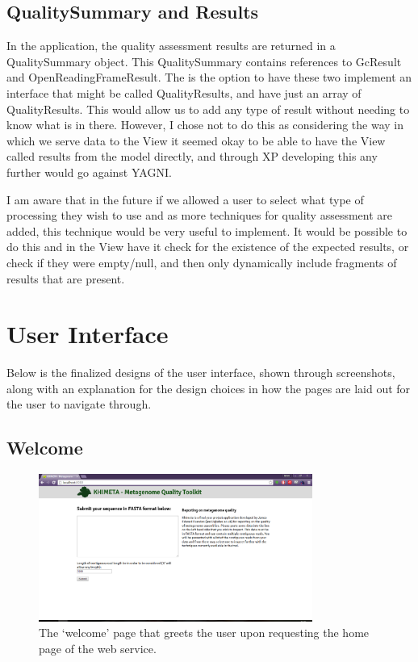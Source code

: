 \subsection{QualitySummary and Results}
In the application, the quality assessment results are returned in a QualitySummary object. This QualitySummary contains references to GcResult and OpenReadingFrameResult. The is the option to have these two implement an interface that might be called QualityResults, and have just an array of QualityResults. This would allow us to add any type of result without needing to know what is in there. However, I chose not to do this as considering the way in which we serve data to the View it seemed okay to be able to have the View called results from the model directly, and through XP developing this any further would go against YAGNI. 

I am aware that in the future if we allowed a user to select what type of processing they wish to use and as more techniques for quality assessment are added, this technique would be very useful to implement. It would be possible to do this and in the View have it check for the existence of the expected results, or check if they were empty/null, and then only dynamically include fragments of results that are present. 

\section{User Interface}
Below is the finalized designs of the user interface, shown through screenshots, along with an explanation for the design choices in how the pages are laid out for the user to navigate through.
\subsection{Welcome}
\begin{figure}[H]
\centering
\includegraphics[width=0.8\textwidth]{images/ui1}
\caption{The `welcome' page that greets the user upon requesting the home page of the web service.}
\end{figure}

